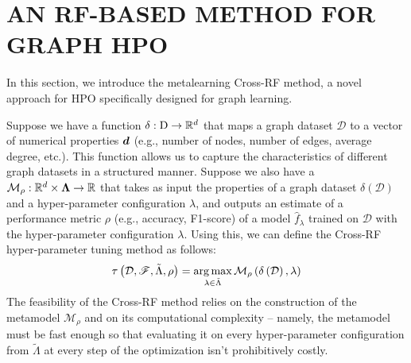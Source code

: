 \section{\uppercase{An RF-based Method for Graph HPO}}
\label{sec:cross-rf}

In this section, we introduce the metalearning Cross-RF method, a novel approach for HPO specifically designed for graph learning.

Suppose we have a  function \( \delta : \mathrm{D} \to \mathbb{R}^d \) that maps a graph dataset \( \mathcal{D} \) to a vector of numerical properties \( \boldsymbol{d} \) (e.g., number of nodes, number of edges, average degree, etc.). This function allows us to capture the characteristics of different graph datasets in a structured manner. Suppose we also have a  \( \mathcal{M}_\rho : \mathbb{R}^d \times \boldsymbol\Lambda \to \mathbb{R} \) that takes as input the properties of a graph dataset \( \delta \left( \mathcal{D} \right) \) and a hyper-parameter configuration \( \lambda \), and outputs an estimate of a performance metric \( \rho \) (e.g., accuracy, F1-score) of a model \( \hat{f}_\lambda \) trained on \( \mathcal{D} \) with the hyper-parameter configuration \( \lambda \). Using this, we can define the Cross-RF hyper-parameter tuning method as follows:
\begin{equation*}
	\tau \left( \mathcal{D}, \mathscr{F}, \tilde{\Lambda}, \rho \right) = \operatorname*{arg\,max}_{\lambda \in \tilde{\Lambda}} \mathcal{M}_\rho \left( \delta \left( \mathcal{D} \right), \lambda \right)
\end{equation*}
The feasibility of the Cross-RF method relies on the construction of the metamodel \( \mathcal{M}_\rho \) and on its computational complexity -- namely, the metamodel must be fast enough so that evaluating it on every hyper-parameter configuration from \( \tilde{\Lambda} \) at every step of the optimization isn't prohibitively costly.

